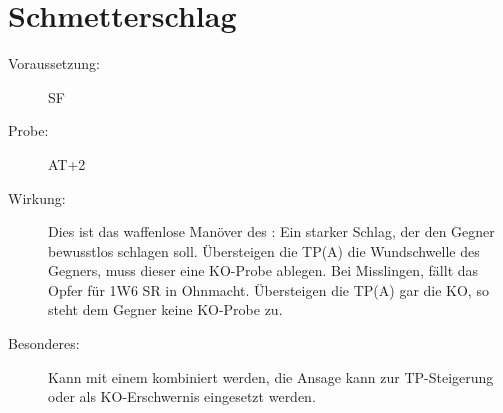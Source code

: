 \section{Schmetterschlag}
\label{uAT.schmetterschlag}
\begin{description}
    \item[Voraussetzung:]
        SF 
    \item[Probe:]
        AT+2
    \item[Wirkung:]
        Dies ist das waffenlose Manöver des :
        Ein starker Schlag, der den Gegner bewusstlos schlagen soll.
        Übersteigen die TP(A) die Wundschwelle des Gegners, muss dieser eine KO-Probe ablegen.
        Bei Misslingen, fällt das Opfer für 1W6 SR in Ohnmacht.
        Übersteigen die TP(A) gar die KO, so steht dem Gegner keine KO-Probe zu.
    \item[Besonderes:]
        Kann mit einem  kombiniert werden, die Ansage kann zur TP-Steigerung oder als KO-Erschwernis eingesetzt werden.
\end{description}

